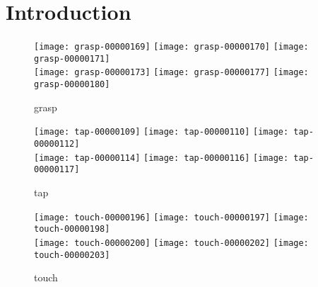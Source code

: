 
\section{Introduction}

\newcommand{\myWidthOne}{0.23}

\begin{figure*}
    \centering
    \subfloat
    { \texttt{[image: grasp-00000169]} } \quad
    \subfloat
    { \texttt{[image: grasp-00000170]} } \quad
    \subfloat
    { \texttt{[image: grasp-00000171]} } \\
    \subfloat
    { \texttt{[image: grasp-00000173]} } \quad
    \subfloat
    { \texttt{[image: grasp-00000177]} } \quad
    \subfloat
    { \texttt{[image: grasp-00000180]} }
    \caption{grasp}
\end{figure*}

\begin{figure*}
    \centering
    \subfloat
    { \texttt{[image: tap-00000109]} } \quad
    \subfloat
    { \texttt{[image: tap-00000110]} } \quad
    \subfloat
    { \texttt{[image: tap-00000112]} } \\
    \subfloat
    { \texttt{[image: tap-00000114]} } \quad
    \subfloat
    { \texttt{[image: tap-00000116]} } \quad
    \subfloat
    { \texttt{[image: tap-00000117]} }
    \caption{tap}
\end{figure*}

\begin{figure*}
    \centering
    \subfloat
    { \texttt{[image: touch-00000196]} } \quad
    \subfloat
    { \texttt{[image: touch-00000197]} } \quad
    \subfloat
    { \texttt{[image: touch-00000198]} } \\
    \subfloat
    { \texttt{[image: touch-00000200]} } \quad
    \subfloat
    { \texttt{[image: touch-00000202]} } \quad
    \subfloat
    { \texttt{[image: touch-00000203]} }
    \caption{touch}
\end{figure*}

